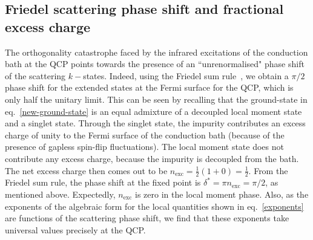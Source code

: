 \documentclass{iopart}
\begin{document}
\subsection{Friedel scattering phase shift and fractional excess charge}\label{excess}
The orthogonality catastrophe faced by the infrared excitations of the conduction bath at the QCP points towards the presence of an ``unrenormalised" phase shift~\cite{anderson1990} of the scattering \(k-\)states. Indeed, using the Friedel sum rule~\cite{friedel_1956,langer1961friedel,langreth1966}, we obtain a \(\pi/2\) phase shift for the extended states at the Fermi surface for the QCP, which is only half the unitary limit. This can be seen by recalling that the ground-state in eq.~\eqref{new-ground-state} is an equal admixture of a decoupled local moment state and a singlet state. Through the singlet state, the impurity contributes an excess charge of unity to the Fermi surface of the conduction bath (because of the presence of gapless spin-flip fluctuations). The local moment state does not contribute any excess charge, because the impurity is decoupled from the bath. The net excess charge then comes out to be \(n_\text{exc} = \frac{1}{2}\left( 1 + 0 \right) = \frac{1}{2}\). From the Friedel sum rule, the phase shift at the fixed point is \(\delta^* = \pi n_\text{exc} = \pi /2\), as mentioned above. Expectedly, \(n_\text{exc}\) is zero in the local moment phase. Also, as the exponents of the algebraic form for the local quantities shown in eq.~\eqref{exponents} are functions of the scattering phase shift, we find that these exponents take universal values precisely at the QCP.
\end{document}

